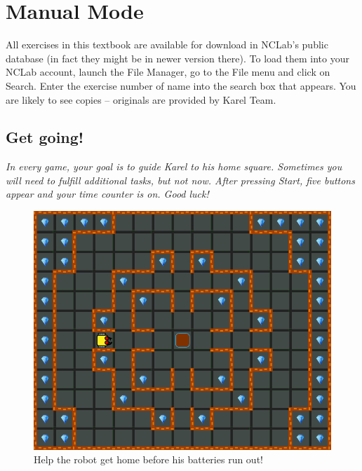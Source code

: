 
\setcounter{section}{2}
\section{Manual Mode}

All exercises in this textbook are available for download in NCLab's
public database (in fact they might be in newer version there). 
To load them into your NCLab account, launch the File Manager, go
to the File menu and click on Search. Enter the exercise number of 
name into the search box that appears. You are likely to see copies
-- originals are provided by Karel Team.  

\subsection{Get going!}

{\em In every game, your goal is to guide Karel to his home square. Sometimes you will need to fulfill additional tasks, but not now. After pressing Start, five buttons appear and your time counter is on. Good luck!}\\[-7mm]
\begin{figure}[!ht]
\begin{center}
\includegraphics[height=0.4\textwidth]{img/a01.png}
\end{center}
\vspace{-4mm}
\caption{Help the robot get home before his batteries run out!}
\label{fig:a01}
\end{figure}

